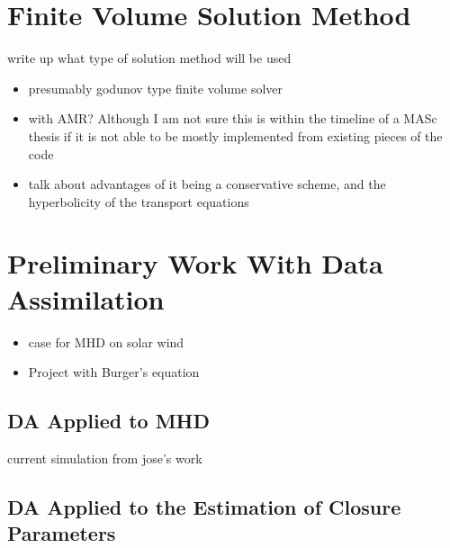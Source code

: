 \documentclass[titlepage,12pt,letterpaper]{article}
\begin{document}
\section{Finite Volume Solution Method}\label{finite_volume}

write up what type of solution method will be used
\begin{itemize}
  \item presumably godunov type finite volume solver
  \item with AMR? Although I am not sure this is within the timeline of a MASc thesis if it is not able to be mostly implemented from existing pieces of the code
  \item talk about advantages of it being a conservative scheme, and the hyperbolicity of the transport equations
\end{itemize}


\section{Preliminary Work With Data Assimilation}\label{DA_work}

\begin{itemize}
  \item case for MHD on solar wind
  \item Project with Burger's equation
\end{itemize}


\subsection{DA Applied to MHD}\label{DA_work:MHD}

current simulation from jose's work


\subsection{DA Applied to the Estimation of Closure Parameters}\label{DA_work:DA_project}

\end{document}
